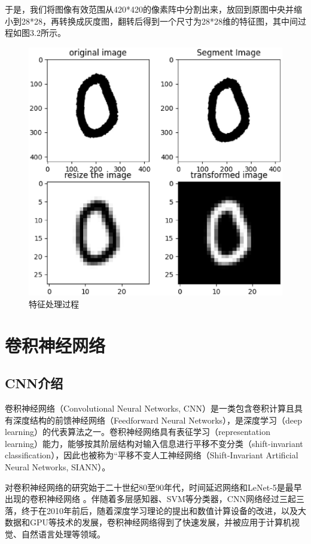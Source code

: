 \documentclass[UTF8, a4paper, 12pt]{report}
\begin{document}
			于是，我们将图像有效范围从420*420的像素阵中分割出来，放回到原图中央并缩小到28*28，再转换成灰度图，翻转后得到一个尺寸为28*28维的特征图，其中间过程如图3.2所示。
			\begin{figure}[!h]
			\centering
			\includegraphics[scale=0.5]{./img/FeatureMapping.eps}
			\caption{特征处理过程}
			\label{fig:3.2}
			\end{figure}
\clearpage

\chapter{卷积神经网络}
	\section{CNN介绍}
		卷积神经网络（Convolutional Neural Networks, CNN）是一类包含卷积计算且具有深度结构的前馈神经网络（Feedforward Neural Networks），是深度学习（deep learning）的代表算法之一。卷积神经网络具有表征学习（representation learning）能力，能够按其阶层结构对输入信息进行平移不变分类（shift-invariant classification），因此也被称为“平移不变人工神经网络（Shift-Invariant Artificial Neural Networks, SIANN）。

		对卷积神经网络的研究始于二十世纪80至90年代，时间延迟网络和LeNet-5是最早出现的卷积神经网络 。伴随着多层感知器、SVM等分类器，CNN网络经过三起三落，终于在2010年前后，随着深度学习理论的提出和数值计算设备的改进，以及大数据和GPU等技术的发展，卷积神经网络得到了快速发展，并被应用于计算机视觉、自然语言处理等领域。
\end{document}
